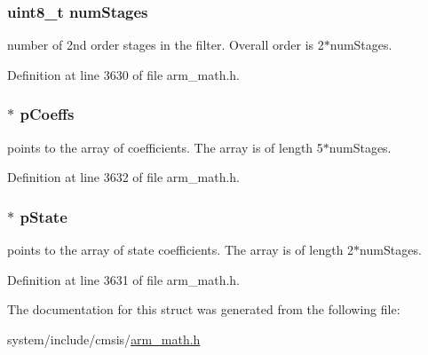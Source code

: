 \subsubsection[{\texorpdfstring{num\+Stages}{numStages}}]{\setlength{\rightskip}{0pt plus 5cm}uint8\+\_\+t num\+Stages}\hypertarget{structarm__biquad__cascade__df2_t__instance__f64_a3615af038f56917909e0370c11bc2ec7}{}\label{structarm__biquad__cascade__df2_t__instance__f64_a3615af038f56917909e0370c11bc2ec7}
number of 2nd order stages in the filter. Overall order is 2$\ast$num\+Stages. 

Definition at line 3630 of file arm\+\_\+math.\+h.

\subsubsection[{\texorpdfstring{p\+Coeffs}{pCoeffs}}]{$\ast$ p\+Coeffs}\hypertarget{structarm__biquad__cascade__df2_t__instance__f64_a2f5f42f60a50d7cb39837fd9b80cd8f0}{}\label{structarm__biquad__cascade__df2_t__instance__f64_a2f5f42f60a50d7cb39837fd9b80cd8f0}
points to the array of coefficients. The array is of length 5$\ast$num\+Stages. 

Definition at line 3632 of file arm\+\_\+math.\+h.

\subsubsection[{\texorpdfstring{p\+State}{pState}}]{$\ast$ p\+State}\hypertarget{structarm__biquad__cascade__df2_t__instance__f64_ae97c926a7e3a4bfe26fcdd0a3cc2f5c6}{}\label{structarm__biquad__cascade__df2_t__instance__f64_ae97c926a7e3a4bfe26fcdd0a3cc2f5c6}
points to the array of state coefficients. The array is of length 2$\ast$num\+Stages. 

Definition at line 3631 of file arm\+\_\+math.\+h.



The documentation for this struct was generated from the following file\+:\begin{DoxyCompactItemize}
\item 
system/include/cmsis/\hyperlink{arm__math_8h}{arm\+\_\+math.\+h}\end{DoxyCompactItemize}
